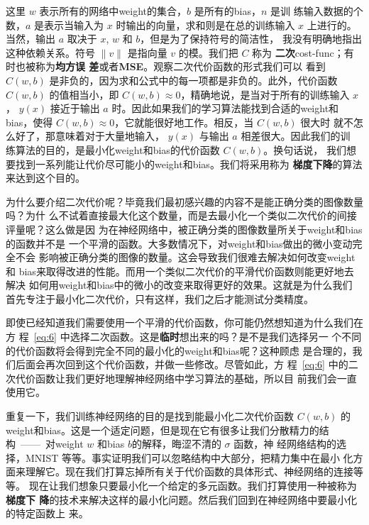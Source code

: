 这里 $w$ 表示所有的网络中\gls*{weight}的集合，$b$ 是所有的\gls*{bias}，$n$ 是训
练输入数据的个数，$a$ 是表示当输入为 $x$ 时输出的向量，求和则是在总的训练输入
$x$ 上进行的。当然，输出 $a$ 取决于 $x$, $w$ 和 $b$，但是为了保持符号的简洁性，
我没有明确地指出这种依赖关系。符号 $\|v\|$ 是指向量 $v$ 的模。我们把 $C$ 称为%
\textbf{二次}\gls*{cost-func}；有时也被称为\textbf{均方误
  差}或者\textbf{MSE}。观察二次代价函数的形式我们可以
看到 $C(w,b)$ 是非负的，因为求和公式中的每一项都是非负的。此外，代价函数
$C(w,b)$ 的值相当小，即 $C(w,b) \approx 0$，精确地说，是当对于所有的训练输入 $x$，
$y(x)$ 接近于输出 $a$ 时。因此如果我们的学习算法能找到合适的\gls*{weight}和%
\gls*{bias}，使得 $C(w,b) \approx 0$，它就能很好地工作。相反，当 $C(w,b)$ 很大时
就不怎么好了，那意味着对于大量地输入， $y(x)$ 与输出 $a$ 相差很大。因此我们的训
练算法的目的，是最小化\gls*{weight}和\gls*{bias}的代价函数 $C(w,b)$。换句话说，
我们想要找到一系列能让代价尽可能小的\gls*{weight}和\gls*{bias}。我们将采用称为%
\textbf{梯度下降}的算法来达到这个目的。

为什么要介绍二次代价呢？毕竟我们最初感兴趣的内容不是能正确分类的图像数量吗？为什
么不试着直接最大化这个数量，而是去最小化一个类似二次代价的间接评量呢？这么做是因
为在神经网络中，被正确分类的图像数量所关于\gls*{weight}和\gls*{bias}的函数并不是
一个平滑的函数。大多数情况下，对\gls*{weight}和\gls*{bias}做出的微小变动完全不会
影响被正确分类的图像的数量。这会导致我们很难去解决如何改变\gls*{weight}和%
\gls*{bias}来取得改进的性能。而用一个类似二次代价的平滑代价函数则能更好地去解决
如何用\gls*{weight}和\gls*{bias}中的微小的改变来取得更好的效果。这就是为什么我们
首先专注于最小化二次代价，只有这样，我们之后才能测试分类精度。

即使已经知道我们需要使用一个平滑的代价函数，你可能仍然想知道为什么我们在方
程~\eqref{eq:6} 中选择二次函数。这是\textbf{临时}想出来的吗？是不是我们选择另一
个不同的代价函数将会得到完全不同的最小化的\gls*{weight}和\gls*{bias}呢？这种顾虑
是合理的，我们后面会再次回到这个代价函数，并做一些修改。尽管如此，方
程~\eqref{eq:6} 中的二次代价函数让我们更好地理解神经网络中学习算法的基础，所以目
前我们会一直使用它。

重复一下，我们训练神经网络的目的是找到能最小化二次代价函数 $C(w,b)$ 的%
\gls*{weight}和\gls*{bias}。这是一个适定问题，但是现在它有很多让我们分散精力的结
构~——~对\gls*{weight} $w$ 和\gls*{bias} $b$的解释，晦涩不清的 $\sigma$ 函数，神
经网络结构的选择，MNIST 等等。事实证明我们可以忽略结构中大部分，把精力集中在最小
化方面来理解它。现在我们打算忘掉所有关于代价函数的具体形式、神经网络的连接等等。
现在让我们想象只要最小化一个给定的多元函数。我们打算使用一种被称为\textbf{梯度下
  降}的技术来解决这样的最小化问题。然后我们回到在神经网络中要最小化的特定函数上
来。

